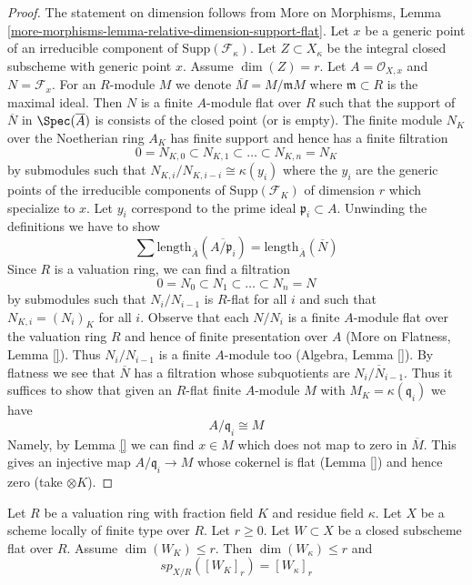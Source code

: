 \begin{proof}
The statement on dimension follows from More on Morphisms, Lemma
\ref{more-morphisms-lemma-relative-dimension-support-flat}.
Let $x$ be a generic point of an irreducible component
of $\text{Supp}(\mathcal{F}_\kappa)$. Let $Z \subset X_\kappa$
be the integral closed subscheme with generic point $x$.
Assume $\dim(Z) = r$. Let $A = \mathcal{O}_{X, x}$ and $N = \mathcal{F}_x$.
For an $R$-module $M$ we denote $\overline{M} = M/\mathfrak m M$
where $\mathfrak m \subset R$ is the maximal ideal.
Then $N$ is a finite $A$-module flat over $R$ such that
the support of $\overline{N}$ in $\Spec(\overline{A})$ is
consists of the closed point (or is empty).
The finite module $N_K$ over the Noetherian ring $A_K$
has finite support and hence has a finite filtration
$$
0 = N_{K, 0} \subset N_{K, 1} \subset \ldots \subset N_{K, n} = N_K
$$
by submodules such that $N_{K, i}/N_{K, i - i} \cong \kappa(y_i)$
where the $y_i$ are the generic points of the irreducible components
of $\text{Supp}(\mathcal{F}_K)$ of dimension $r$ which specialize to $x$.
Let $y_i$ correspond to the prime ideal $\mathfrak p_i \subset A$.
Unwinding the definitions we have to show
$$
\sum \text{length}_{\overline{A}}(\overline{A/\mathfrak p_i})
=
\text{length}_{\overline{A}}(\overline{N})
$$
Since $R$ is a valuation ring, we can find a filtration
$$
0 = N_0 \subset N_1 \subset \ldots \subset N_n = N
$$
by submodules such that $N_i/N_{i - 1}$ is $R$-flat for all $i$
and such that $N_{K, i} = (N_i)_K$ for all $i$.
Observe that each $N/N_i$ is a finite $A$-module flat over the
valuation ring $R$ and hence of finite presentation over $A$
(More on Flatness, Lemma \ref{}). Thus $N_i/N_{i - 1}$ is a
finite $A$-module too (Algebra, Lemma \ref{}). By flatness we see that
$\overline{N}$ has a filtration whose subquotients are
$\overline{N_i/N_{i - 1}}$. Thus it suffices to show that given
an $R$-flat finite $A$-module $M$ with $M_K = \kappa(\mathfrak q_i)$
we have
$$
A/\mathfrak q_i \cong M
$$
Namely, by Lemma \ref{} we can find $x \in M$ which does not map
to zero in $\overline{M}$. This gives an injective map
$A/\mathfrak q_i \to M$ whose cokernel is flat (Lemma \ref{})
and hence zero (take $\otimes K$).
\end{proof}

\begin{lemma}
\label{lemma-specialization-closed}
Let $R$ be a valuation ring with fraction field $K$ and residue field $\kappa$.
Let $X$ be a scheme locally of finite type over $R$. Let $r \geq 0$.
Let $W \subset X$ be a closed subscheme flat over $R$. Assume
$\dim(W_K) \leq r$. Then $\dim(W_\kappa) \leq r$ and
$$
sp_{X/R}([W_K]_r) = [W_\kappa]_r
$$
\end{lemma}

